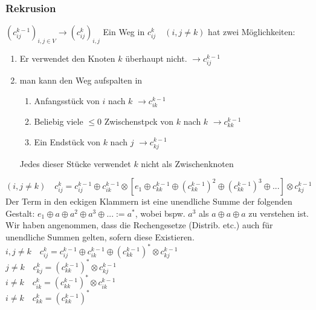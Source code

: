 \subsubsection{Rekrusion}
$(c_{ij}^{k-1})_{i,j \in V} \rightarrow (c_{ij}^k)_{i,j}$ 
Ein Weg in $c_{ij}^k \quad (i,j \neq k)$ hat zwei Möglichkeiten:
\begin{enumerate}
\item Er verwendet den Knoten $k$ überhaupt nicht. $\rightarrow c_{ij}^{k-1}$
\item man kann den Weg aufspalten in 
\begin{enumerate}
\item Anfangsstück von $i$ nach $k$ $\rightarrow c_{ik}^{k-1}$
\item Beliebig viele $\leq 0$ Zwischenstpck von $k$ nach $k$ $\rightarrow c_{kk}^{k-1}$
\item Ein Endstück von $k$ nach $j$ $\rightarrow c_{kj}^{k-1}$
\end{enumerate}
Jedes dieser Stücke verwendet $k$ nicht als Zwischenknoten
\end{enumerate}
$(i,j \neq k) \quad c_{ij}^k = c_{ij}^{k-1} \oplus c_{ik}^{k-1} \otimes [e_1 \oplus c_{kk}^{k-1} \oplus (c_{kk}^{k-1})^2 \oplus (c_{kk}^{k-1})^3 \oplus ...] \otimes c_{kj}^{k-1}$\\
Der Term in den eckigen Klammern ist eine unendliche Summe der folgenden Gestalt:
$e_1 \oplus a \oplus a^2 \oplus a^3 \oplus ... := a^*$, wobei bspw. $a^3$ als $a \oplus a \oplus a$ zu verstehen ist.\\
Wir haben angenommen, dass die Rechengesetze (Distrib. etc.) auch für unendliche Summen gelten, sofern diese Existieren.\\
$i,j \neq k \quad c_{ij}^k = c_{ij}^{k-1} \oplus c_{ik}^{k-1} \oplus (c_{kk}^{k-1})^* \otimes c_{kj}^{k-1}$\\
$j\neq k \quad c_{kj}^k = (c_{kk}^{k-1})^* \otimes c_{kj}^{k-1}$\\
$i\neq k \quad c_{ik}^k = (c_{kk}^{k-1})^* \otimes c_{ik}^{k-1}$\\
$i\neq k \quad c_{kk}^k = (c_{kk}^{k-1})^*$ \\
